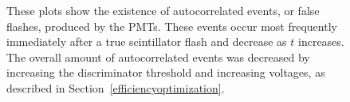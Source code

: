 \begin{figure}[h]
\begin{center}
\hspace{-7mm}
\vspace{-2mm}
\vspace{-2mm}
\vspace{-2mm}
\caption{These plots show the existence of autocorrelated events, or false flashes, produced by the PMTs.  These events occur most frequently immediately after a true scintillator flash and decrease as $t$ increases.  The overall amount of autocorrelated events was decreased by increasing the discriminator threshold and increasing voltages, as described in Section~\ref{efficiencyoptimization}.}
\label{fig:autocorr}
\end{center}
\end{figure}

